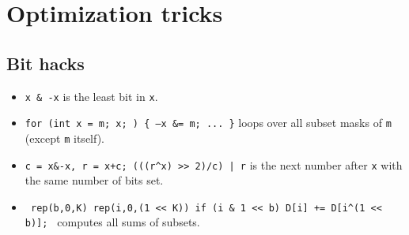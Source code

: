 

\section{Optimization tricks}
\subsection{Bit hacks}
\begin{itemize}
	\item \texttt{x \& -x} is the least bit in \texttt{x}.
	\item \texttt{for (int x = m; x; ) \{ --x \&= m; ... \}} loops over all subset masks of \texttt{m} (except \texttt{m} itself).
	\item \texttt{c = x\&-x, r = x+c; (((r\^{}x) >> 2)/c) | r} is the next number after \texttt{x} with the same number of bits set.
	\item \texttt{ rep(b,0,K) rep(i,0,(1 << K)) if (i \& 1 << b) D[i] += D[i\^{}(1 << b)]; } computes all sums of subsets.
\end{itemize}
